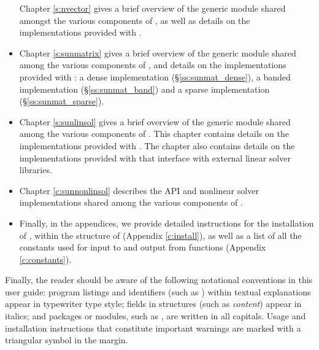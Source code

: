 \begin{itemize}
  Chapter \ref{s:nvector} gives a brief overview of the generic
  {\nvector} module shared amongst the various components of
  {\sundials}, as well as details on the {\nvector}
  implementations provided with {\sundials}. 
\item
Chapter \ref{s:sunmatrix} gives a brief overview of the generic
  {\sunmatrix} module shared among the various components of
  {\sundials}, and details on the {\sunmatrix} implementations
  provided with {\sundials}: 
  a dense implementation (\S\ref{ss:sunmat_dense}),
  a banded implementation (\S\ref{ss:sunmat_band}) and
  a sparse implementation (\S\ref{ss:sunmat_sparse}).
\item
  Chapter \ref{s:sunlinsol} gives a brief overview of the generic
  {\sunlinsol} module shared among the various components of
  {\sundials}.  This chapter contains details on the {\sunlinsol}
  implementations provided with {\sundials}.
  The chapter
  also contains details on the {\sunlinsol} implementations provided
  with {\sundials} that interface with external linear solver
  libraries.
\item
  Chapter \ref{c:sunnonlinsol} describes the {\sunnonlinsol} API and nonlinear
  solver implementations shared among the various components of {\sundials}.
\item
  Finally, in the appendices, we provide detailed instructions for the installation
  of {\idas}, within the structure of {\sundials} (Appendix \ref{c:install}), as
  well as a list of all the constants used for input to and output from {\idas}
  functions
  (Appendix \ref{c:constants}).
\end{itemize}

Finally, the reader should be aware of the following notational conventions
in this user guide:  program listings and identifiers (such as ) 
within textual explanations appear in typewriter type style; 
fields in {\CC} structures (such as {\em content}) appear in italics;
and packages or modules, such as {\idadls}, are written in all capitals. 
Usage and installation instructions that constitute important warnings
are marked with a triangular symbol {\warn} in the margin.



